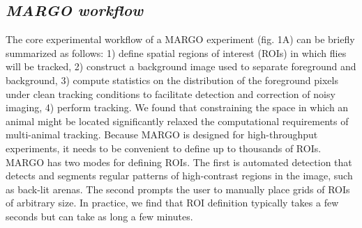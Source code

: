 \documentclass[10pt,letterpaper]{article}
\begin{document}
\subsection*{\textit{MARGO workflow}}

The core experimental workflow of a MARGO experiment (fig. 1A) can be briefly summarized as follows: 1) define spatial regions of interest (ROIs) in which flies will be tracked, 2) construct a background image used to separate foreground and background, 3) compute statistics on the distribution of the foreground pixels under clean tracking conditions to facilitate detection and correction of noisy imaging, 4) perform tracking. We found that constraining the space in which an animal might be located significantly relaxed the computational requirements of multi-animal tracking. Because MARGO is designed for high-throughput experiments, it needs to be convenient to define up to thousands of ROIs. MARGO has two modes for defining ROIs. The first is automated detection that detects and segments regular patterns of high-contrast regions in the image, such as back-lit arenas. The second prompts the user to manually place grids of ROIs of arbitrary size. In practice, we find that ROI definition typically takes a few seconds but can take as long a few minutes.
\end{document}
